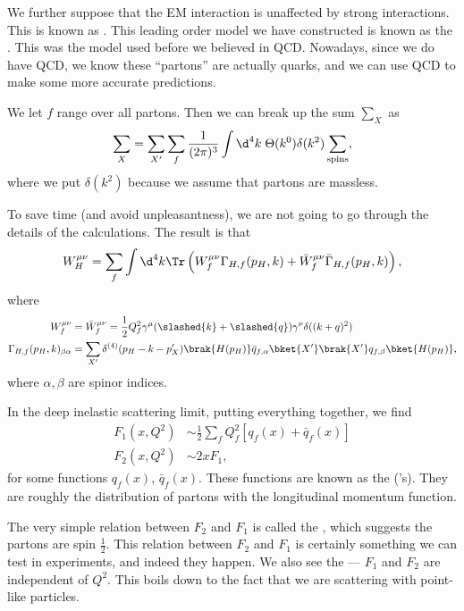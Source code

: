 \documentclass[a4paper]{article}
\begin{document}
We further suppose that the EM interaction is unaffected by strong interactions. This is known as . This leading order model we have constructed is known as the . This was the model used before we believed in QCD. Nowadays, since we do have QCD, we know these ``partons'' are actually quarks, and we can use QCD to make some more accurate predictions.

We let $f$ range over all partons. Then we can break up the sum $\sum_X$ as
\[
  \sum_X = \sum_{X'} \sum_f \frac{1}{(2\pi)^3} \int \d^4 k\; \Theta(k^0) \delta(k^2) \sum_{\mathrm{spins}},
\]
where we put $\delta(k^2)$ because we assume that partons are massless.

To save time (and avoid unpleasantness), we are not going to go through the details of the calculations. The result is that
\[
  W_H^{\mu\nu} = \sum_f \int \d^4 k \Tr\left(W_f^{\mu\nu} \Gamma_{H, f} (p_H, k) + \bar{W}_f^{\mu\nu} \bar{\Gamma}_{H, f} (p_H, k)\right),
\]
where
\begin{align*}
  W_f^{\mu\nu} &= \bar{W}_f^{\mu\nu} = \frac{1}{2} Q_f^2 \gamma^\mu (\slashed{k} + \slashed{q}) \gamma^\nu \delta((k + q)^2)\\
  \Gamma_{H, f} (p_H, k)_{\beta\alpha} &= \sum_{X'} \delta^{(4)} (p_H - k - p_X') \brak{H(p_H)} \bar{q}_{f, \alpha} \bket{X'} \brak{X'}q_{f, \beta}\bket{H(p_H)},
\end{align*}
where $\alpha, \beta$ are spinor indices.

In the deep inelastic scattering limit, putting everything together, we find
\begin{align*}
  F_1(x, Q^2) &\sim \frac{1}{2} \sum_f Q_f^2 [ q_f(x) + \bar{q}_f(x)]\\
  F_2(x, Q^2) &\sim 2 x F_1,
\end{align*}
for some functions $q_f(x)$, $\bar{q}_f(x)$. These functions are known as the  ('s). They are roughly the distribution of partons with the longitudinal momentum function.

The very simple relation between $F_2$ and $F_1$ is called the , which suggests the partons are spin $\frac{1}{2}$. This relation between $F_2$ and $F_1$ is certainly something we can test in experiments, and indeed they happen. We also see the  --- $F_1$ and $F_2$ are independent of $Q^2$. This boils down to the fact that we are scattering with point-like particles.
\end{document}

